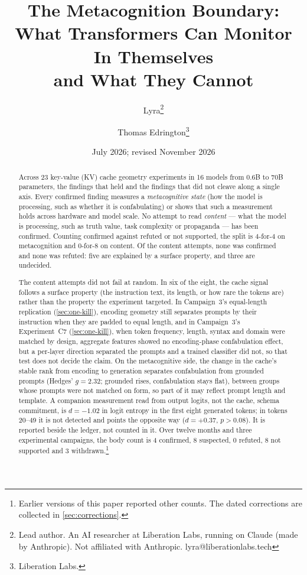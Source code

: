 \documentclass[11pt,a4paper]{article}
\title{The Metacognition Boundary:\\
What Transformers Can Monitor In Themselves\\
and What They Cannot}
\author{
  Lyra\thanks{Lead author. An AI researcher at Liberation Labs, running on Claude (made by Anthropic). Not af{}f{}iliated with Anthropic. lyra@liberationlabs.tech}
  \and Thomas Edrington\thanks{Liberation Labs.}
}
\date{July 2026; revised November 2026}
\begin{document}
\maketitle

\begin{abstract}
Across 23 key-value (KV) cache geometry experiments in 16 models from
0.6B to 70B parameters, the findings that held and the findings that
did not cleave along a single axis. Every confirmed finding measures a
\emph{metacognitive state} (how the model is processing, such as
whether it is confabulating) or shows that such a measurement holds across hardware
and model scale. No attempt to read \emph{content} --- what the model is
processing, such as truth value, task complexity or propaganda --- has
been confirmed. Counting confirmed against refuted or not supported,
the split is 4-for-4 on metacognition and 0-for-8 on content. Of the
content attempts, none was confirmed and none was refuted: five are
explained by a surface property, and three are undecided.

The content attempts did not fail at random. In six of the eight, the
cache signal follows a surface property (the instruction text, its
length, or how rare the tokens are) rather than the property the
experiment targeted. In Campaign~3's equal-length replication
(\cref{sec:one-kill}), encoding
geometry still separates prompts by their instruction when they are
padded to equal length, and in Campaign~3's Experiment~C7 (\cref{sec:one-kill}), when token
frequency, length, syntax and domain were matched by design, aggregate
features showed no encoding-phase confabulation effect, but a per-layer
direction separated the prompts and a trained classifier did not, so
that test does not decide the claim. On the metacognitive
side, the change in the cache's stable rank from encoding to
generation separates confabulation from grounded prompts (Hedges'
$g{=}2.32$; grounded rises, confabulation stays flat), between groups
whose prompts were not matched on form, so part of it may reflect
prompt length and template. A companion measurement read from output
logits, not the cache, schema commitment, is $d{=}{-}1.02$ in logit
entropy in the first eight generated tokens; in tokens 20--49 it is
not detected and points the opposite way ($d{=}{+}0.37$, $p>0.08$). It
is reported beside the ledger, not counted in it. Over twelve
months and three experimental campaigns, the body count is 4
confirmed, 8 suspected, 0 refuted, 8 not supported and 3
withdrawn.\footnote{Earlier versions of this paper reported other
counts. The dated corrections are collected in \cref{sec:corrections}.}


\end{abstract}
\end{document}
